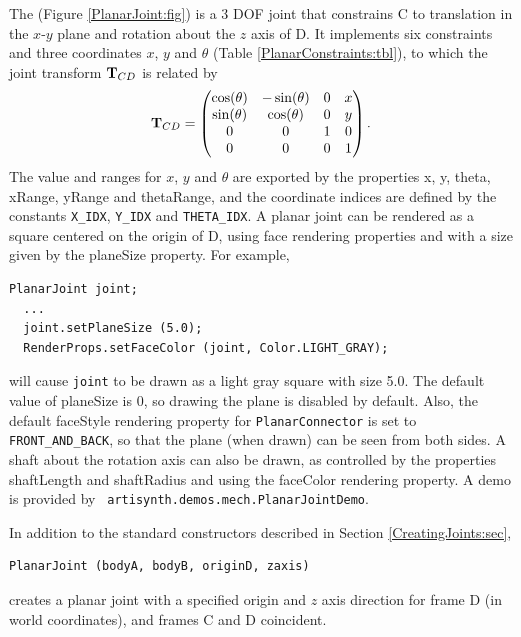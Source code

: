 The  
(Figure \ref{PlanarJoint:fig}) is a 3 DOF
joint that constrains C to translation in the $x$-$y$ plane 
and rotation about the $z$ axis of D.  It implements six
constraints and three coordinates $x$, $y$ and $\theta$
(Table \ref{PlanarConstraints:tbl}), to which the joint transform
${\bf T}_{CD}$ is related by
%
\begin{equation*}
{\bf T}_{CD} = \left(\begin{matrix}
\cos(\theta) & -\sin(\theta) & 0 & x \\
\sin(\theta) &  \cos(\theta) & 0 & y \\
0 & 0 & 1 & 0 \\
0 & 0 & 0 & 1 
\end{matrix}\right).
\end{equation*}
The value and ranges for $x$, $y$ and $\theta$ are exported by the
properties {\sf x}, {\sf y}, {\sf theta}, {\sf xRange}, {\sf yRange}
and {\sf thetaRange}, and the coordinate indices are defined by the
constants {\tt X\_IDX}, {\tt Y\_IDX} and {\tt THETA\_IDX}.  
A planar joint can be rendered as a square centered on the origin
of D, using face rendering properties and with a size given by the
{\sf planeSize} property. For example,
%
\begin{lstlisting}[]
  PlanarJoint joint;
  ...
  joint.setPlaneSize (5.0);
  RenderProps.setFaceColor (joint, Color.LIGHT_GRAY);
\end{lstlisting}
%
will cause {\tt joint} to be drawn as a light gray square with size
5.0. The default value of {\sf planeSize} is 0, so drawing the plane
is disabled by default. Also, the default {\sf faceStyle} rendering
property for {\tt PlanarConnector} is set to {\tt FRONT\_AND\_BACK},
so that the plane (when drawn) can be seen from both sides.  A shaft
about the rotation axis can also be drawn, as controlled by the
properties {\sf shaftLength} and {\sf shaftRadius} and using the {\sf
faceColor} rendering property.  A demo is provided by {\tt
artisynth.demos.mech.PlanarJointDemo}.

In addition to the standard constructors described in
Section \ref{CreatingJoints:sec},
\begin{lstlisting}[]
  PlanarJoint (bodyA, bodyB, originD, zaxis)
\end{lstlisting}
%
creates a planar joint with a specified origin and $z$ axis direction
for frame D (in world coordinates), and frames C and D coincident.

